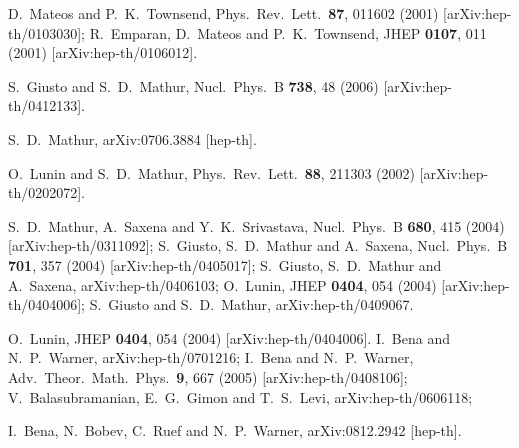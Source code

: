 \documentclass[12pt]{article}
\begin{document}
\begin{thebibliography}{99}
D.~Mateos and P.~K.~Townsend,
Phys.\ Rev.\ Lett.\  {\bf 87}, 011602 (2001)
[arXiv:hep-th/0103030];
R.~Emparan, D.~Mateos and P.~K.~Townsend,
JHEP {\bf 0107}, 011 (2001)
[arXiv:hep-th/0106012].

  S.~Giusto and S.~D.~Mathur,
  Nucl.\ Phys.\  B {\bf 738}, 48 (2006)
  [arXiv:hep-th/0412133].
  
  S.~D.~Mathur,
  arXiv:0706.3884 [hep-th].

O.~Lunin and S.~D.~Mathur,
Phys.\ Rev.\ Lett.\  {\bf 88}, 211303 (2002)
[arXiv:hep-th/0202072].
%

S.~D.~Mathur, A.~Saxena and Y.~K.~Srivastava,
Nucl.\ Phys.\ B {\bf 680}, 415 (2004)
[arXiv:hep-th/0311092];
S.~Giusto, S.~D.~Mathur and A.~Saxena,
Nucl.\ Phys.\ B {\bf 701}, 357 (2004)
[arXiv:hep-th/0405017];
S.~Giusto, S.~D.~Mathur and A.~Saxena,
arXiv:hep-th/0406103;
O.~Lunin,
JHEP {\bf 0404}, 054 (2004)
[arXiv:hep-th/0404006];
S.~Giusto and S.~D.~Mathur,
arXiv:hep-th/0409067.

  O.~Lunin,
JHEP {\bf 0404}, 054 (2004)
[arXiv:hep-th/0404006].
I.~Bena and N.~P.~Warner,
  arXiv:hep-th/0701216;
 I.~Bena and N.~P.~Warner,
  Adv.\ Theor.\ Math.\ Phys.\  {\bf 9}, 667 (2005)
  [arXiv:hep-th/0408106];
  V.~Balasubramanian, E.~G.~Gimon and T.~S.~Levi,
  arXiv:hep-th/0606118;

        I.~Bena, N.~Bobev, C.~Ruef and N.~P.~Warner,
        arXiv:0812.2942 [hep-th].


\end{thebibliography}
\end{document}
